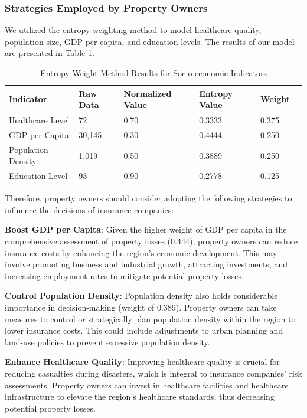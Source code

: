 \documentclass[12pt]{article}
\begin{document}
\subsubsection{Strategies Employed by Property Owners}
We utilized the entropy weighting method to model healthcare quality, population size, GDP per capita, and education levels. The results of our model are presented in Table \ref{tab:entropy_weights}.
\begin{table}[ht]
\caption{Entropy Weight Method Results for Socio-economic Indicators}
\centering
\begin{tabular}{@{}llllll@{}}
\toprule[1.2pt]
Indicator & Raw Data & Normalized Value & Entropy Value & Weight \\
\midrule
Healthcare Level & 72 & 0.70 & 0.3333 & 0.375 \\
GDP per Capita & 30,145 & 0.30 & 0.4444 & 0.250 \\
Population Density & 1,019 & 0.50 & 0.3889 & 0.250 \\
Education Level & 93 & 0.90 & 0.2778 & 0.125 \\
\bottomrule[1.2pt]
\end{tabular}
\label{tab:entropy_weights}
\end{table}

Therefore, property owners should consider adopting the following strategies to influence the decisions of insurance companies:

\textbf{Boost GDP per Capita}: Given the higher weight of GDP per capita in the comprehensive assessment of property losses (0.444), property owners can reduce insurance costs by enhancing the region's economic development. This may involve promoting business and industrial growth, attracting investments, and increasing employment rates to mitigate potential property losses.

\textbf{Control Population Density}: Population density also holds considerable importance in decision-making (weight of 0.389). Property owners can take measures to control or strategically plan population density within the region to lower insurance costs. This could include adjustments to urban planning and land-use policies to prevent excessive population density.

\textbf{Enhance Healthcare Quality}: Improving healthcare quality is crucial for reducing casualties during disasters, which is integral to insurance companies' risk assessments. Property owners can invest in healthcare facilities and healthcare infrastructure to elevate the region's healthcare standards, thus decreasing potential property losses.
\end{document}
